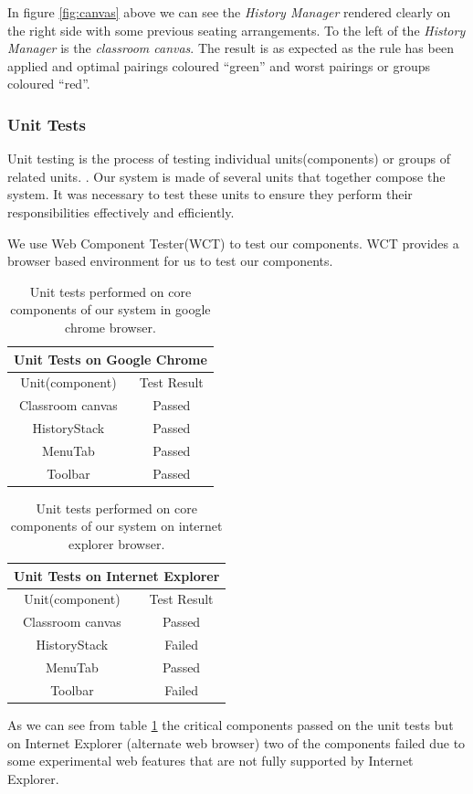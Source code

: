 In figure \ref{fig:canvas} above we can see the \emph{History Manager} rendered clearly on the right side with some previous seating arrangements. To the left of the \emph{History Manager} is the \emph{classroom canvas}. The result is as expected as the rule has been applied and optimal pairings coloured ``green'' and worst pairings or groups coloured ``red''.

\subsubsection{Unit Tests}
Unit testing is the process of testing individual units(components) or groups of related units. \cite{runeson2006survey}. Our system is made of several units that together compose the system. It was necessary to test these units to ensure they perform their responsibilities effectively and efficiently.

We use Web Component Tester(WCT) \cite{website:Polymer-Github} to test our components. WCT provides a browser based environment for us to test our components.
\begin{table}
    \begin{tabular}{|c|c|}
        \hline
        \multicolumn{2}{|c|}{Unit Tests on Google Chrome} \\
        \hline
        Unit(component)         &     Test Result \\
        \hline
        Classroom canvas        &     Passed \\
        HistoryStack            &     Passed \\
        MenuTab                 &     Passed \\
        Toolbar                 &     Passed \\
        \hline
    \end{tabular}
    \caption{\label{tab:unit-chrome}Unit tests performed on core components of our system in google chrome browser.}
\end{table}

\begin{table}
    \begin{tabular}{|c|c|}
        \hline
        \multicolumn{2}{|c|}{Unit Tests on Internet Explorer} \\
        \hline
        Unit(component)         &     Test Result \\
        \hline
        Classroom canvas        &     Passed \\
        HistoryStack            &     Failed \\
        MenuTab                 &     Passed \\
        Toolbar                 &     Failed \\
        \hline
    \end{tabular}
    \caption{\label{tab:unit-explorer}Unit tests performed on core components of our system on internet explorer browser.}
\end{table}
As we can see from table \ref{tab:unit-chrome} the critical components passed on the unit tests but on Internet Explorer (alternate web browser) two of the components failed due to some experimental web features that are not fully supported by Internet Explorer.
